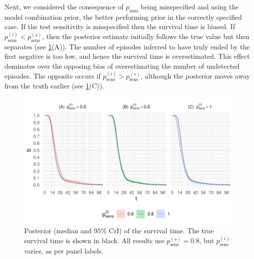 \documentclass[12pt]{article}
\newcommand{\psens}{p_\text{sens}}
\newcommand{\psenss}{p_\text{sens}^{(s)}}
\newcommand{\psensi}{p_\text{sens}^{(i)}}
\begin{document}
Next, we considered the consequence of $\psens$ being misspecified and using the model combination prior, the better performing prior in the correctly specified case.
If the test sensitivity is misspecified then the survival time is biased.
If $\psensi < \psenss$, then the posterior estimate initially follows the true value but then separates (see \cref{imperf-test:fig:misspecified-test-sensitivity}(A)).
The number of episodes inferred to have truly ended by the first negative is too low, and hence the survival time is overestimated.
This effect dominates over the opposing bias of overestimating the number of undetected episodes.
The opposite occurs if $\psensi > \psenss$, although the posterior moves away from the truth earlier (see \cref{imperf-test:fig:misspecified-test-sensitivity}(C)).
\begin{figure}
  \includegraphics[width=\textwidth]{figures/output/sim-misspecified-sensitivity}
  \caption[Simulation study results with misspecified test sensitivity]{%
    Posterior (median and 95\% CrI) of the survival time.
    The true survival time is shown in black.
    All results use $\psenss = 0.8$, but $\psensi$ varies, as per panel labels.
  }
  \label{imperf-test:fig:misspecified-test-sensitivity}
\end{figure}
\end{document}
